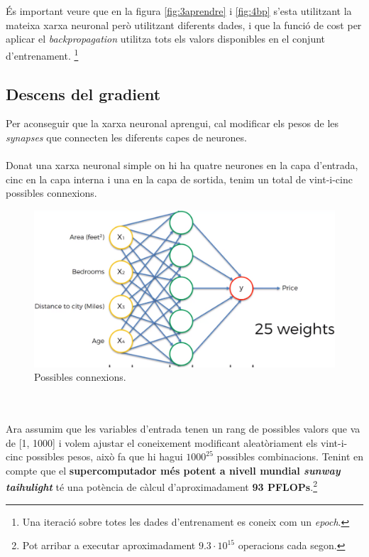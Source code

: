 \documentclass[12pt]{article}
\begin{document}
\\\\És important veure que en la figura \ref{fig:3aprendre} i \ref{fig:4bp} s'esta utilitzant la mateixa xarxa neuronal però utilitzant diferents dades, i que la funció de cost per aplicar el \textit{backpropagation} utilitza tots els valors disponibles en el conjunt d'entrenament. \footnote{Una iteració sobre totes les dades d'entrenament es coneix com un \textit{epoch}.}


\clearpage
\subsection{Descens del gradient\label{dg}}
Per aconseguir que la xarxa neuronal aprengui, cal modificar els pesos de les \textit{synapses} que connecten les diferents capes de neurones.
\\\\Donat una xarxa neuronal simple on hi ha quatre neurones en la capa d'entrada, cinc en la capa interna i una en la capa de sortida, tenim un total de vint-i-cinc possibles connexions. 
\begin{figure}[h!]
	\centering
	\includegraphics[scale=0.3]{imatges/dg/1dg.png}
	\caption{Possibles connexions.}
\end{figure}
\\\\Ara assumim que les variables d'entrada tenen un rang de possibles valors que va de [1, 1000] i volem ajustar el coneixement modificant aleatòriament els vint-i-cinc possibles pesos, això fa que hi hagui \textbf{$1000^{25}$} possibles combinacions. Tenint en compte que el \textbf{supercomputador més potent a nivell mundial \textit{sunway taihulight}} té una potència de càlcul d'aproximadament \textbf{93 PFLOPs}\cite{SC}.\footnote{Pot arribar a executar aproximadament $9.3 \cdot 10^{15}$ operacions cada segon.}
\end{document}
